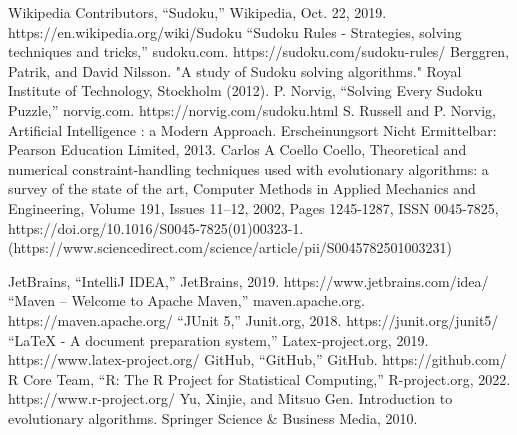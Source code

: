 \documentclass[a4paper,11pt]{article}
\begin{document}
\newpage
\begin{thebibliography}{20}
 Wikipedia Contributors, “Sudoku,” Wikipedia, Oct. 22, 2019. https://en.wikipedia.org/wiki/Sudoku
 “Sudoku Rules - Strategies, solving techniques and tricks,” sudoku.com. https://sudoku.com/sudoku-rules/
 Berggren, Patrik, and David Nilsson. "A study of Sudoku solving algorithms." Royal Institute of Technology, Stockholm (2012).
	P. Norvig, “Solving Every Sudoku Puzzle,” norvig.com. https://norvig.com/sudoku.html
 S. Russell and P. Norvig, Artificial Intelligence : a Modern Approach. Erscheinungsort Nicht Ermittelbar: Pearson Education Limited, 2013.
 Carlos A Coello Coello, Theoretical and numerical constraint-handling techniques used with evolutionary algorithms: a survey of the state of the art, Computer Methods in Applied Mechanics and Engineering, Volume 191, Issues 11–12, 2002, Pages 1245-1287, ISSN 0045-7825, https://doi.org/10.1016/S0045-7825(01)00323-1. (https://www.sciencedirect.com/science/article/pii/S0045782501003231)

 JetBrains, “IntelliJ IDEA,” JetBrains, 2019. https://www.jetbrains.com/idea/
 “Maven – Welcome to Apache Maven,” maven.apache.org. https://maven.apache.org/
 “JUnit 5,” Junit.org, 2018. https://junit.org/junit5/
 “LaTeX - A document preparation system,” Latex-project.org, 2019. https://www.latex-project.org/
 GitHub, “GitHub,” GitHub. https://github.com/
 R Core Team, “R: The R Project for Statistical Computing,” R-project.org, 2022. https://www.r-project.org/
 Yu, Xinjie, and Mitsuo Gen. Introduction to evolutionary algorithms. Springer Science \& Business Media, 2010.

\end{thebibliography}
\end{document}

